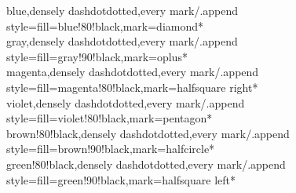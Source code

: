 \documentclass[a4paper]{article}
\begin{document}
{	blue,densely dashdotdotted,every mark/.append style={fill=blue!80!black},mark=diamond*\\
	gray,densely dashdotdotted,every mark/.append style={fill=gray!90!black},mark=oplus*\\
	magenta,densely dashdotdotted,every mark/.append style={fill=magenta!80!black},mark=halfsquare right*\\
	violet,densely dashdotdotted,every mark/.append style={fill=violet!80!black},mark=pentagon*\\
	brown!80!black,densely dashdotdotted,every mark/.append style={fill=brown!90!black},mark=halfcircle*\\
	green!80!black,densely dashdotdotted,every mark/.append style={fill=green!90!black},mark=halfsquare left*\\
}

\end{document}
